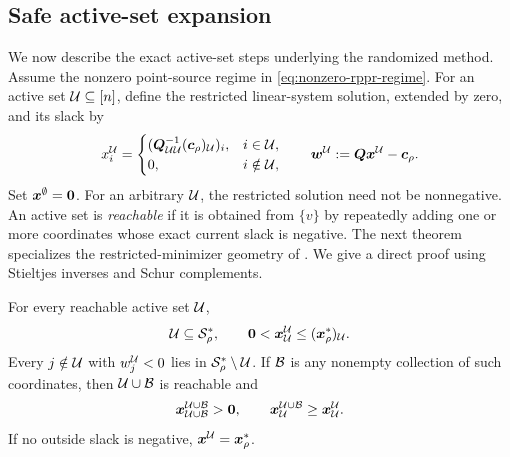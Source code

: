 \subsection{Safe active-set expansion}
\label{subsec:reachable-faces}

We now describe the exact active-set steps underlying the randomized
method. Assume the nonzero point-source regime in
\cref{eq:nonzero-rppr-regime}. For an active set $\mathcal{U}\subseteq[n]$, define
the restricted linear-system solution, extended by zero, and its slack by
\begin{equation*}
 x_i^{\mathcal{U}}=
 \begin{cases}
  (\bm{Q}_{\mathcal{U}\mathcal{U}}^{-1}(\bm{c}_\rho)_{\mathcal{U}})_i,&i\in \mathcal{U},\\
  0,&i\notin \mathcal{U},
 \end{cases}
 \qquad
 \bm{w}^{\mathcal{U}}:=\bm{Q}\bm{x}^{\mathcal{U}}-\bm{c}_\rho.
\end{equation*}
Set $\bm{x}^\emptyset=\bm{0}$. For an arbitrary $\mathcal{U}$, the restricted
solution need not be nonnegative. An active set is \emph{reachable} if it
is obtained from $\{v\}$ by repeatedly adding one or more coordinates
whose exact current slack is negative. The next theorem specializes the
restricted-minimizer geometry of
\citet[Proposition~2 and Section~3]{martinezrubio2023accelerated}.
We give a direct proof using Stieltjes inverses and Schur complements.

\begin{theorem}
\label{thm:safe-batched-pivots}
For every reachable active set $\mathcal{U}$,
\begin{equation*}
 \mathcal{U}\subseteq\mathcal S_\rho^*,
 \qquad
 \bm{0}<\bm{x}_{\mathcal{U}}^{\mathcal{U}}\leq(\bm{x}_\rho^*)_{\mathcal{U}}.
\end{equation*}
Every $j\notin \mathcal{U}$ with $w_j^{\mathcal{U}}<0$ lies in
$\mathcal S_\rho^*\setminus \mathcal{U}$.  If $\mathcal{B}$ is any nonempty collection of such
coordinates, then $\mathcal{U}\cup \mathcal{B}$ is reachable and
\begin{equation*}
 \bm{x}_{\mathcal{U}\cup \mathcal{B}}^{\mathcal{U}\cup \mathcal{B}}>\bm{0},
 \qquad
 \bm{x}_{\mathcal{U}}^{\mathcal{U}\cup \mathcal{B}}\geq\bm{x}_{\mathcal{U}}^{\mathcal{U}}.
\end{equation*}
If no outside slack is negative, $\bm{x}^{\mathcal{U}}=\bm{x}_\rho^*$.
\end{theorem}

